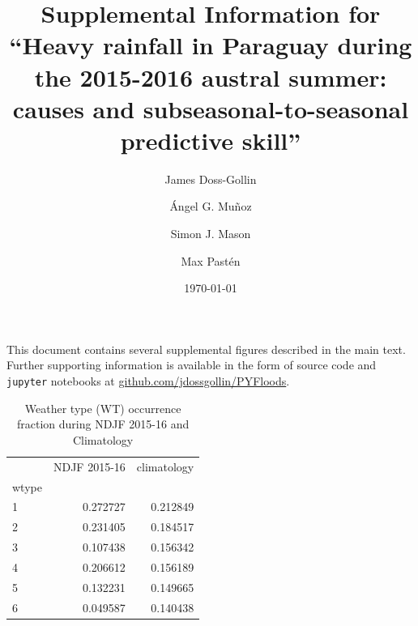 \documentclass{article}
\title{Supplemental Information for\\``Heavy rainfall in Paraguay during the 2015-2016 austral summer: causes and subseasonal-to-seasonal predictive skill''}
\author{James Doss-Gollin\and \'{A}ngel G. Mu\~{n}oz  \and Simon J. Mason \and Max Past\'{e}n }
\date{\today}
\begin{document}
\maketitle

This document contains several supplemental figures described in the main text.
Further supporting information is available in the form of source code and \texttt{jupyter} notebooks at \url{github.com/jdossgollin/PYFloods}.

\listoftables
\listoffigures

\clearpage

\begin{table}
	\centering
	\begin{tabular}{lrr}
		\toprule
		{} &  NDJF 2015-16 &  climatology \\
		wtype &               &              \\
		\midrule
		1     &      0.272727 &     0.212849 \\
		2     &      0.231405 &     0.184517 \\
		3     &      0.107438 &     0.156342 \\
		4     &      0.206612 &     0.156189 \\
		5     &      0.132231 &     0.149665 \\
		6     &      0.049587 &     0.140438 \\
		\bottomrule
		\end{tabular}
	\caption{Weather type (WT) occurrence fraction during NDJF 2015-16 and Climatology}
\end{table}

\clearpage
\end{document}
